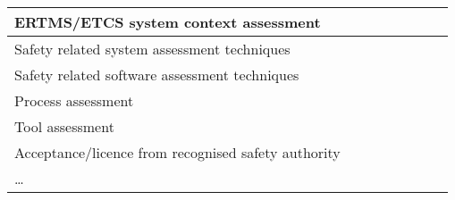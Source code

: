 \documentclass[a4paper, 11pt]{article}
\begin{document}
\begin{center}
\begin{longtable}{|r|r|r|r|r|r|r|r|}
    \multicolumn{1}{|l|}{ERTMS/ETCS system context assessment} & \multicolumn{1}{l|}{} &       &       &       &       &       &  \bigstrut[b]\\
    \hline
    \multicolumn{1}{|l|}{Safety related system assessment techniques} & \multicolumn{1}{l|}{} &       &       &       &       &       &  \bigstrut\\
    \hline
    \multicolumn{1}{|l|}{Safety related software assessment techniques} & \multicolumn{1}{l|}{} &       &       &       &       &       &  \bigstrut\\
    \hline
    \multicolumn{1}{|l|}{Process assessment} & \multicolumn{1}{l|}{} &       &       &       &       &       &  \bigstrut\\
    \hline
    \multicolumn{1}{|l|}{Tool assessment} & \multicolumn{1}{l|}{} &       &       &       &       &       &  \bigstrut\\
    \hline
    \multicolumn{1}{|l|}{Acceptance/licence from recognised safety authority} & \multicolumn{1}{l|}{} &       &       &       &       &       &  \bigstrut\\
    \hline
    \multicolumn{1}{|l|}{…} & \multicolumn{1}{l|}{} &       &       &       &       &       &  \bigstrut\\
    \hline
 
    \end{longtable}%




\end{center}
\end{document}
